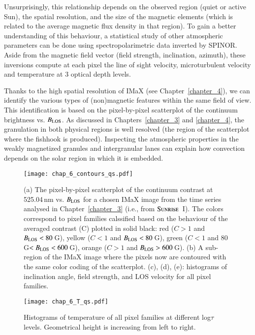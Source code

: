 \documentclass[goettingen, gauss, print]{thesis}
\begin{document}
Unsurprisingly, this relationship depends on the observed region (quiet or active Sun), the spatial resolution, and the size of the magnetic elements (which is related to the average magnetic flux density in that region). To gain a better understanding of this behaviour, a statistical study of other atmospheric parameters can be done using spectropolarimetric data inverted by SPINOR. Aside from the magnetic field vector (field strength, inclination, azimuth), these inversions compute at each pixel the line of sight velocity, microturbulent velocity and temperature at 3 optical depth levels.

Thanks to the high spatial resolution of IMaX (see Chapter~\ref{chapter_4}), we can identify the various types of (non)magnetic features within the same field of view. This identification is based on the pixel-by-pixel scatterplot of the continuum brightness vs. $B_{\rm LOS}$. As discussed in Chapters~\ref{chapter_3} and \ref{chapter_4}, the granulation in both physical regions is well resolved (the region of the scatterplot where the fishhook is produced). Inspecting the atmospheric properties in the weakly magnetized granules and intergranular lanes can explain how convection depends on the solar region in which it is embedded. 

\begin{figure}[h!]
\centering
\texttt{[image: chap\_6\_contours\_qs.pdf]}
\caption{(a) The pixel-by-pixel scatterplot of the continuum contrast at 525.04\,nm vs. $B_{\rm LOS}$ for a chosen IMaX image from the time series analysed in Chapter~\ref{chapter_3} (i.e., from $\textsc{Sunrise}$~I). The colors correspond to pixel families calssified based on the behaviour of the averaged contrast (C) plotted in solid black: red ($C>1$ and $B_{\rm LOS}<80$\,G), yellow ($C<1$ and $B_{\rm LOS}<80$\,G), green ($C<1$ and 80\,G$<B_{\rm LOS}<600$\,G), orange ($C>1$ and $B_{\rm LOS} >600$\,G). (b) A sub-region of the IMaX image where the pixels now are contoured with the same color coding of the scatterplot. (c), (d), (e): histograms of inclination angle, field strength, and LOS velocity for all pixel families.}
\label{contours_qs}

\end{figure}

\begin{figure}
\centering
\hspace*{-2cm}\texttt{[image: chap\_6\_T\_qs.pdf]}

\caption{Histograms of temperature of all pixel families at different log$\tau$ levels. Geometrical height is increasing from left to right.}
\label{T_qs}
\end{figure}
\end{document}
